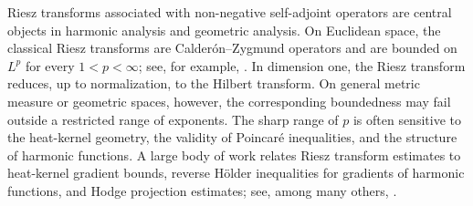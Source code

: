 \documentclass[12pt]{amsart}
\begin{document}
\noindent
Riesz transforms associated with non-negative self-adjoint operators are central objects in harmonic analysis and geometric analysis. On Euclidean space, the classical Riesz transforms are Calder\'on--Zygmund operators and are bounded on $L^p$ for every $1<p<\infty$; see, for example, \cite{R,CZ}. In dimension one, the Riesz transform reduces, up to normalization, to the Hilbert transform. On general metric measure or geometric spaces, however, the corresponding boundedness may fail outside a restricted range of exponents. The sharp range of $p$ is often sensitive to the heat-kernel geometry, the validity of Poincar\'e inequalities, and the structure of harmonic functions. A large body of work relates Riesz transform estimates to heat-kernel gradient bounds, reverse H\"older inequalities for gradients of harmonic functions, and Hodge projection estimates; see, among many others, \cite{ACDH,Shen,CJKS,Jiang,CD2}.
\end{document}
